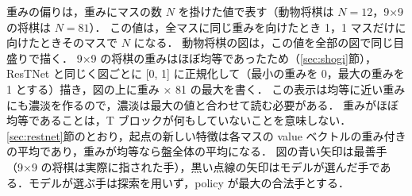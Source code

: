 \documentclass[submit]{ipsj}
\begin{document}
重みの偏りは，重みにマスの数 $N$ を掛けた値で表す（動物将棋は $N = 12$，9×9 の将棋は $N = 81$）．
この値は，全マスに同じ重みを向けたとき 1，1 マスだけに向けたときそのマスで $N$ になる．
動物将棋の図は，この値を全部の図で同じ目盛りで描く．
9×9 の将棋の重みはほぼ均等であったため（\ref{sec:shogi}節），ResTNet と同じく図ごとに [0, 1] に正規化して（最小の重みを 0，最大の重みを 1 とする）描き，図の上に重み × 81 の最大を書く．
この表示は均等に近い重みにも濃淡を作るので，濃淡は最大の値と合わせて読む必要がある．
重みがほぼ均等であることは，T ブロックが何もしていないことを意味しない．
\ref{sec:restnet}節のとおり，起点の新しい特徴は各マスの value ベクトルの重み付きの平均であり，重みが均等なら盤全体の平均になる．
図の青い矢印は最善手（9×9 の将棋は実際に指された手），黒い点線の矢印はモデルが選んだ手である．モデルが選ぶ手は探索を用いず，policy が最大の合法手とする．

\end{document}
